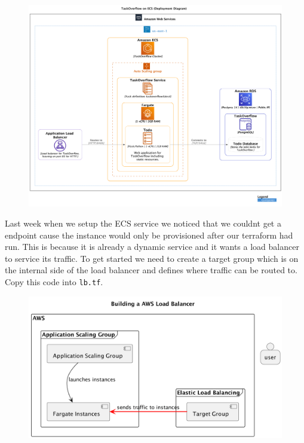 \documentclass{csse4400}
\begin{document}
\begin{figure}[H]
  \includegraphics[width=\textwidth]{diagrams/ecsdeployment}
\end{figure}

Last week when we setup the ECS service we noticed that we couldnt get a endpoint cause the instance would only be provisioned after our terraform had run. This is because it is already a dynamic service and it wants a load balancer to service its traffic. To get started we need to create a target group which is on the internal side of the load balancer and defines where traffic can be routed to. Copy this code into \texttt{lb.tf}.

\begin{figure}[H]
  \begin{center}
    \includegraphics[scale=0.2]{diagrams/lb2fargate}
  \end{center}
\end{figure}
\end{document}
